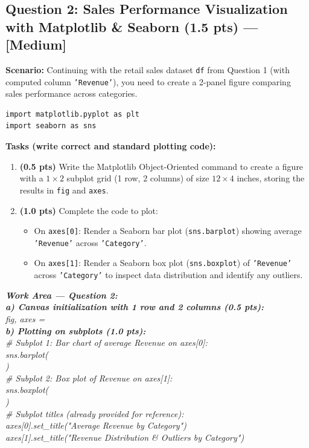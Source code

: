 \documentclass[11pt,a4paper]{article}
\newcommand{\answerbox}[2]{
  \vspace{1mm}
  \begin{tcolorbox}[
    colback=white,
    colframe=gray!60,
    boxrule=0.6pt,
    arc=2pt,
    height=#1,
    left=3mm, right=3mm, top=2mm, bottom=2mm
  ]
  \small\textit{\color{gray}#2}
  \end{tcolorbox}
  \vspace{1mm}
}
\begin{document}
\subsection*{Question 2: Sales Performance Visualization with Matplotlib \& Seaborn (1.5 pts) --- [Medium]}

\noindent
\textbf{Scenario:} Continuing with the retail sales dataset \texttt{df} from Question 1 (with computed column \texttt{'Revenue'}), you need to create a 2-panel figure comparing sales performance across categories.

\begin{lstlisting}
import matplotlib.pyplot as plt
import seaborn as sns
\end{lstlisting}

\noindent
\textbf{Tasks (write correct and standard plotting code):}
\begin{enumerate}[label=\textbf{\alph*)}]
  \item \textbf{(0.5 pts)} Write the Matplotlib Object-Oriented command to create a figure with a $1 \times 2$ subplot grid (1 row, 2 columns) of size $12 \times 4$ inches, storing the results in \texttt{fig} and \texttt{axes}.
  \item \textbf{(1.0 pts)} Complete the code to plot:
  \begin{itemize}
    \item On \texttt{axes[0]}: Render a Seaborn bar plot (\texttt{sns.barplot}) showing average \texttt{'Revenue'} across \texttt{'Category'}.
    \item On \texttt{axes[1]}: Render a Seaborn box plot (\texttt{sns.boxplot}) of \texttt{'Revenue'} across \texttt{'Category'} to inspect data distribution and identify any outliers.
  \end{itemize}
\end{enumerate}

\answerbox{13.0cm}{
\textbf{Work Area --- Question 2:}\\[3mm]
\textbf{a) Canvas initialization with 1 row and 2 columns (0.5 pts):}\\
fig, axes = \dotfill\\[6mm]
\textbf{b) Plotting on subplots (1.0 pts):}\\[2mm]
\textit{\# Subplot 1: Bar chart of average Revenue on axes[0]:}\\
sns.barplot(\dotfill\\[4mm]
\hspace*{2.5cm}\dotfill)\\[6mm]
\textit{\# Subplot 2: Box plot of Revenue on axes[1]:}\\
sns.boxplot(\dotfill\\[4mm]
\hspace*{2.5cm}\dotfill)\\[6mm]
\textit{\# Subplot titles (already provided for reference):}\\
axes[0].set\_title("Average Revenue by Category")\\
axes[1].set\_title("Revenue Distribution \& Outliers by Category")
}
\end{document}
